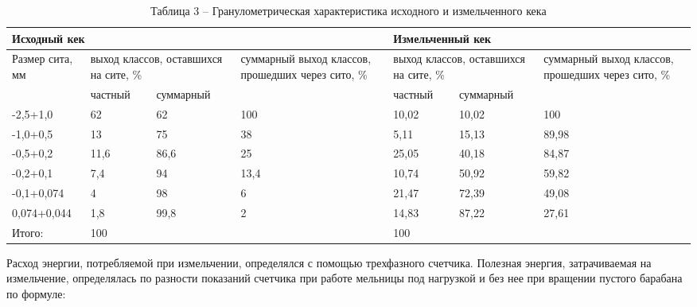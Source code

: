 \begin{table}[H]
\caption*{Таблица 3 -- Гранулометрическая характеристика исходного и измельченного кека}
\centering
\begin{tabular}{|lllp{}|llp{}|}
\hline
\multicolumn{4}{|l|}{Исходный кек} & \multicolumn{3}{l|}{Измельченный кек} \\ \hline
\multicolumn{1}{|l|}{\multirow{2}{*}{Размер сита, мм}} & \multicolumn{2}{p{0.18\textwidth}|}{выход классов, оставшихся на сите, \%} & \multirow{2}{=}{суммарный выход классов, прошедших через сито, \%} & \multicolumn{2}{p{0.18\textwidth}|}{выход классов, оставшихся на сите, \%} & \multirow{2}{=}{суммарный выход классов, прошедших через сито, \%} \\ \cline{2-3} \cline{5-6}
\multicolumn{1}{|l|}{} & \multicolumn{1}{l|}{частный} & \multicolumn{1}{l|}{суммарный} &  & \multicolumn{1}{l|}{частный} & \multicolumn{1}{l|}{суммарный} &  \\ \hline
\multicolumn{1}{|l|}{-2,5+1,0} & \multicolumn{1}{l|}{62} & \multicolumn{1}{l|}{62} & 100 & \multicolumn{1}{l|}{10,02} & \multicolumn{1}{l|}{10,02} & 100 \\ \hline
\multicolumn{1}{|l|}{-1,0+0,5} & \multicolumn{1}{l|}{13} & \multicolumn{1}{l|}{75} & 38 & \multicolumn{1}{l|}{5,11} & \multicolumn{1}{l|}{15,13} & 89,98 \\ \hline
\multicolumn{1}{|l|}{-0,5+0,2} & \multicolumn{1}{l|}{11,6} & \multicolumn{1}{l|}{86,6} & 25 & \multicolumn{1}{l|}{25,05} & \multicolumn{1}{l|}{40,18} & 84,87 \\ \hline
\multicolumn{1}{|l|}{-0,2+0,1} & \multicolumn{1}{l|}{7,4} & \multicolumn{1}{l|}{94} & 13,4 & \multicolumn{1}{l|}{10,74} & \multicolumn{1}{l|}{50,92} & 59,82 \\ \hline
\multicolumn{1}{|l|}{-0,1+0,074} & \multicolumn{1}{l|}{4} & \multicolumn{1}{l|}{98} & 6 & \multicolumn{1}{l|}{21,47} & \multicolumn{1}{l|}{72,39} & 49,08 \\ \hline
\multicolumn{1}{|l|}{0,074+0,044} & \multicolumn{1}{l|}{1,8} & \multicolumn{1}{l|}{99,8} & 2 & \multicolumn{1}{l|}{14,83} & \multicolumn{1}{l|}{87,22} & 27,61 \\ \hline
\multicolumn{1}{|l|}{Итого:} & \multicolumn{1}{l|}{100} & \multicolumn{1}{l|}{} &  & \multicolumn{1}{l|}{100} & \multicolumn{1}{l|}{} &  \\ \hline
\end{tabular}
\end{table}

Расход энергии, потребляемой при измельчении, определялся с помощью
трехфазного счетчика. Полезная энергия, затрачиваемая на измельчение,
определялась по разности показаний счетчика при работе мельницы под
нагрузкой и без нее при вращении пустого барабана по формуле:

